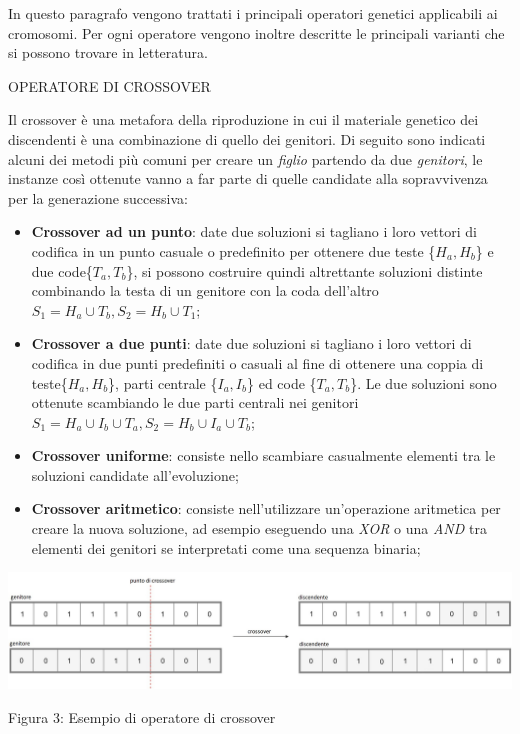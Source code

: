 \documentclass[11pt]{article}
\begin{document}
In questo paragrafo vengono trattati i principali operatori genetici applicabili ai cromosomi. Per ogni operatore vengono inoltre descritte le principali varianti che si possono trovare in letteratura.


\vspace{2\baselineskip}
OPERATORE DI CROSSOVER
\vspace{2\baselineskip}

Il crossover è una metafora della riproduzione in cui il materiale genetico dei discendenti è una combinazione di quello dei genitori. Di seguito sono indicati alcuni dei metodi più comuni per creare un \textit{figlio} partendo da due \textit{genitori}, le instanze così ottenute vanno a far parte di quelle candidate alla sopravvivenza per la generazione successiva:

\begin{itemize}
    \item \textbf{Crossover ad un punto}: date due soluzioni si tagliano i loro vettori di codifica in un punto casuale o predefinito per ottenere due teste \{$H_a, H_b$\} e due code\{$T_a, T_b$\}, si possono costruire quindi altrettante soluzioni distinte combinando la testa di un genitore con la coda dell'altro $S_1 = H_a \cup T_b , S_2 = H_b \cup T_1$;
    
    \item \textbf{Crossover a due punti}: date due soluzioni si tagliano i loro vettori di codifica in due punti predefiniti o casuali al fine di ottenere una coppia di teste\{$H_a, H_b$\}, parti centrale \{$I_a, I_b$\} ed code \{$T_a, T_b$\}. Le due soluzioni sono ottenute scambiando le due parti centrali nei genitori $S_1 = H_a \cup I_b \cup T_a , S_2 = H_b \cup I_a \cup T_b$;
    
    \item \textbf{Crossover uniforme}: consiste nello scambiare casualmente elementi tra le soluzioni candidate all'evoluzione;
    
    \item \textbf{Crossover aritmetico}: consiste nell'utilizzare un'operazione aritmetica per creare la nuova soluzione, ad esempio eseguendo una \textit{XOR} o una \textit{AND} tra elementi dei genitori se interpretati come una sequenza binaria;
\end{itemize}

\begin{center}
    \includegraphics[scale=0.5]{selezioneSP}
    
    Figura 3: Esempio di operatore di crossover
\end{center}
\end{document}
